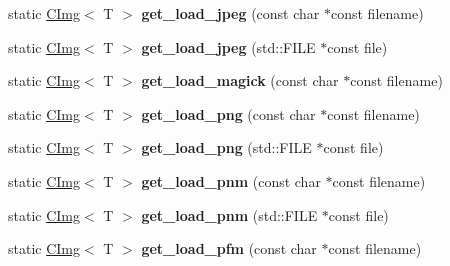 \begin{DoxyCompactItemize}
\item 
\hypertarget{structcimg__library_1_1CImg_a5fb25ae4e078d63d73430a5f87876287}{
static \hyperlink{structcimg__library_1_1CImg}{CImg}$<$ T $>$ {\bfseries get\_\-load\_\-jpeg} (const char $\ast$const filename)}
\label{structcimg__library_1_1CImg_a5fb25ae4e078d63d73430a5f87876287}

\item 
\hypertarget{structcimg__library_1_1CImg_a88b6f847f0f524b3290d936378f75f44}{
static \hyperlink{structcimg__library_1_1CImg}{CImg}$<$ T $>$ {\bfseries get\_\-load\_\-jpeg} (std::FILE $\ast$const file)}
\label{structcimg__library_1_1CImg_a88b6f847f0f524b3290d936378f75f44}

\item 
\hypertarget{structcimg__library_1_1CImg_af7100b79cd6e054a37a4930fe334f288}{
static \hyperlink{structcimg__library_1_1CImg}{CImg}$<$ T $>$ {\bfseries get\_\-load\_\-magick} (const char $\ast$const filename)}
\label{structcimg__library_1_1CImg_af7100b79cd6e054a37a4930fe334f288}

\item 
\hypertarget{structcimg__library_1_1CImg_af3eb559d3dea149210424da8a987402b}{
static \hyperlink{structcimg__library_1_1CImg}{CImg}$<$ T $>$ {\bfseries get\_\-load\_\-png} (const char $\ast$const filename)}
\label{structcimg__library_1_1CImg_af3eb559d3dea149210424da8a987402b}

\item 
\hypertarget{structcimg__library_1_1CImg_a2a564320aeb1b7045ef0b7688ccb4e90}{
static \hyperlink{structcimg__library_1_1CImg}{CImg}$<$ T $>$ {\bfseries get\_\-load\_\-png} (std::FILE $\ast$const file)}
\label{structcimg__library_1_1CImg_a2a564320aeb1b7045ef0b7688ccb4e90}

\item 
\hypertarget{structcimg__library_1_1CImg_a0bbe1d291276726fd9aada63d2455e06}{
static \hyperlink{structcimg__library_1_1CImg}{CImg}$<$ T $>$ {\bfseries get\_\-load\_\-pnm} (const char $\ast$const filename)}
\label{structcimg__library_1_1CImg_a0bbe1d291276726fd9aada63d2455e06}

\item 
\hypertarget{structcimg__library_1_1CImg_a3e102f8a470615c1c0aa786f36e47941}{
static \hyperlink{structcimg__library_1_1CImg}{CImg}$<$ T $>$ {\bfseries get\_\-load\_\-pnm} (std::FILE $\ast$const file)}
\label{structcimg__library_1_1CImg_a3e102f8a470615c1c0aa786f36e47941}

\item 
\hypertarget{structcimg__library_1_1CImg_a559d93cb3f586196fa3625d43aae4884}{
static \hyperlink{structcimg__library_1_1CImg}{CImg}$<$ T $>$ {\bfseries get\_\-load\_\-pfm} (const char $\ast$const filename)}
\label{structcimg__library_1_1CImg_a559d93cb3f586196fa3625d43aae4884}


\end{DoxyCompactItemize}
